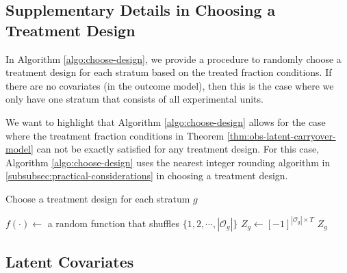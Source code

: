     {\blue 
    \subsection{Supplementary Details in Choosing a Treatment Design}\label{subsec:more-details-choose-design}
    
    In Algorithm \ref{algo:choose-design}, we provide a procedure to randomly choose a treatment design for each stratum based on the treated fraction conditions. If there are no covariates (in the outcome model), then this is the case where we only have one stratum that consists of all experimental units. 
    
    We want to highlight that Algorithm \ref{algo:choose-design} allows for the case where the treatment fraction conditions in Theorem \ref{thm:obs-latent-carryover-model} can not be exactly satisfied for any treatment design. For this case, Algorithm \ref{algo:choose-design} uses the nearest integer rounding algorithm in \ref{subsubsec:practical-considerations} in choosing a treatment design.
    
    
    	\begin{algorithm}[htp]
 \caption{Choose a treatment design for each stratum $g$}  \label{algo:choose-design}
 \nl {} 
  \nl {}
  \nl $f(\cdot)  \leftarrow $ a random function that shuffles $\{1, 2, \cdots, |\mathcal{O}_g| \}$\;
  \nl $Z_g \leftarrow [-1]^{|\mathcal{O}_g| \times T}$ \;
  \nl {}
  \nl \KwRet $Z_g $\;
\end{algorithm} 
    

\subsection{Latent Covariates}\label{subsec:latent-covariates}

}
